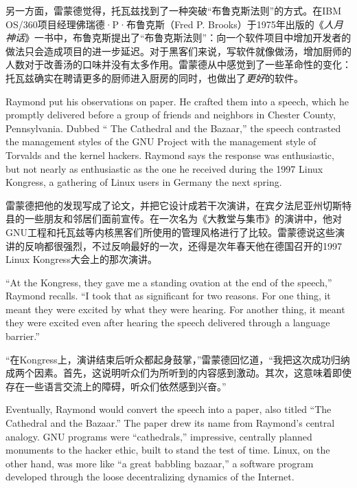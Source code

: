 \ifdefined\chs
另一方面，雷蒙德觉得，托瓦兹找到了一种突破``布鲁克斯法则''的方式。在IBM OS/360项目经理佛瑞德·P·布鲁克斯（Fred P. Brooks）于1975年出版的《\textit{人月神话}》一书中，布鲁克斯提出了``布鲁克斯法则''：向一个软件项目中增加开发者的做法只会造成项目的进一步延迟。对于黑客们来说，写软件就像做汤，增加厨师的人数对于改善汤的口味并没有太多作用。雷蒙德从中感觉到了一些革命性的变化：托瓦兹确实在聘请更多的厨师进入厨房的同时，也做出了\textit{更好}的软件。
\fi

\ifdefined\eng
Raymond put his observations on paper. He crafted them into a speech, which he promptly delivered before a group of friends and neighbors in Chester County, Pennsylvania. Dubbed `` The Cathedral and the Bazaar,'' the speech contrasted the management styles of the GNU Project with the management style of Torvalds and the kernel hackers. Raymond says the response was enthusiastic, but not nearly as enthusiastic as the one he received during the 1997 Linux Kongress, a gathering of Linux users in Germany the next spring.
\fi

\ifdefined\chs
雷蒙德把他的发现写成了论文，并把它设计成若干次演讲，在宾夕法尼亚州切斯特县的一些朋友和邻居们面前宣传。在一次名为《大教堂与集市》的演讲中，他对GNU工程和托瓦兹等内核黑客们所使用的管理风格进行了比较。雷蒙德说这些演讲的反响都很强烈，不过反响最好的一次，还得是次年春天他在德国召开的1997 Linux Kongress大会上的那次演讲。
\fi

\ifdefined\eng
``At the Kongress, they gave me a standing ovation at the end of the speech,'' Raymond recalls. ``I took that as significant for two reasons. For one thing, it meant they were excited by what they were hearing. For another thing, it meant they were excited even after hearing the speech delivered through a language barrier.''
\fi

\ifdefined\chs
``在Kongress上，演讲结束后听众都起身鼓掌，''雷蒙德回忆道，``我把这次成功归纳成两个因素。首先，这说明听众们为所听到的内容感到激动。其次，这意味着即使存在一些语言交流上的障碍，听众们依然感到兴奋。''
\fi

\ifdefined\eng
Eventually, Raymond would convert the speech into a paper, also titled ``The Cathedral and the Bazaar.'' The paper drew its name from Raymond's central analogy. GNU programs were ``cathedrals,'' impressive, centrally planned monuments to the hacker ethic, built to stand the test of time. Linux, on the other hand, was more like ``a great babbling bazaar,'' a software program developed through the loose decentralizing dynamics of the Internet.
\fi

